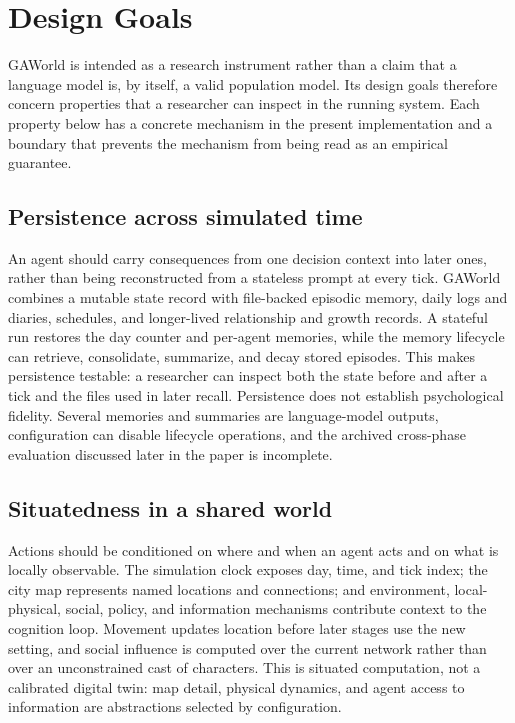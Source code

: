 \section{Design Goals}
\label{sec:design-goals}

GAWorld is intended as a research instrument rather than a claim that a
language model is, by itself, a valid population model.  Its design goals
therefore concern properties that a researcher can inspect in the running
system.  Each property below has a concrete mechanism in the present
implementation and a boundary that prevents the mechanism from being read as
an empirical guarantee.

\subsection{Persistence across simulated time}

An agent should carry consequences from one decision context into later ones,
rather than being reconstructed from a stateless prompt at every tick.
GAWorld combines a mutable state record with file-backed episodic memory,
daily logs and diaries, schedules, and longer-lived relationship and growth
records.  A stateful run restores the day counter and per-agent memories, while
the memory lifecycle can retrieve, consolidate, summarize, and decay stored
episodes.  This makes persistence testable: a researcher can inspect both the
state before and after a tick and the files used in later recall.  Persistence
does not establish psychological fidelity.  Several memories and summaries
are language-model outputs, configuration can disable lifecycle operations,
and the archived cross-phase evaluation discussed later in the paper is
incomplete.

\subsection{Situatedness in a shared world}

Actions should be conditioned on where and when an agent acts and on what is
locally observable.  The simulation clock exposes day, time, and tick index;
the city map represents named locations and connections; and environment,
local-physical, social, policy, and information mechanisms contribute context
to the cognition loop.  Movement updates location before later stages use the
new setting, and social influence is computed over the current network rather
than over an unconstrained cast of characters.  This is situated computation,
not a calibrated digital twin: map detail, physical dynamics, and agent access
to information are abstractions selected by configuration.

